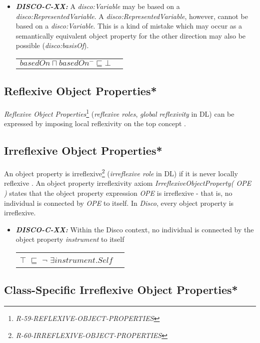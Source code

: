 \documentclass{llncs}
\newenvironment{DL}{
  \vspace{0cm}
  \begin{tabular}{r l}

}{
  \end{tabular}
}
\begin{document}
\begin{itemize}
	\item \textbf{{\em DISCO-C-XX:}} 
A {\em disco:Variable} may be based on a {\em disco:RepresentedVariable}.
A {\em disco:RepresentedVariable}, however, cannot be based on a {\em disco:Variable}.
This is a kind of mistake which may occur as a semantically equivalent object property for the other direction may also be possible ({\em disco:basisOf}).

\begin{DL}
$basedOn \sqcap basedOn^{-} \sqsubseteq \bot$ 
\end{DL}
\end{itemize}

\subsection{Reflexive Object Properties*}

\emph{Reflexive Object Properties}\footnote{\emph{R-59-REFLEXIVE-OBJECT-PROPERTIES}} (\emph{reflexive roles}, \emph{global reflexivity} in DL) can be expressed by imposing local reflexivity on the top concept \cite{Kroetzsch2012}.

\subsection{Irreflexive Object Properties*}

An object property is irreflexive\footnote{\emph{R-60-IRREFLEXIVE-OBJECT-PROPERTIES}} (\emph{irreflexive role} in DL) if it is never locally reflexive \cite{Kroetzsch2012}.
An object property irreflexivity axiom \emph{IrreflexiveObjectProperty( OPE )} states that the object property expression \emph{OPE} is irreflexive - that is, no individual is connected by \emph{OPE} to itself. 
In \emph{Disco}, every object property is irreflexive.

\begin{itemize}
  \item \textbf{{\em DISCO-C-XX:}}
Within the Disco context, no individual is connected by the object property {\em instrument} to itself

\begin{DL}
$\top$ $\sqsubseteq$ $\neg$ $\exists  instrument . Self$ 
\end{DL}
\end{itemize}

\subsection{Class-Specific Irreflexive Object Properties*}
\end{document}

